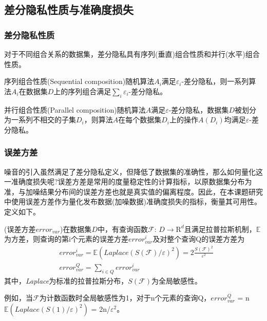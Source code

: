 \subsection{差分隐私性质与准确度损失}

\subsubsection{差分隐私性质}
对于不同组合关系的数据集，差分隐私具有序列(垂直)组合性质和并行(水平)组合性质。

\begin{lem}
	序列组合性质(Sequential composition)\supercite{composition}随机算法$A_{i}$满足$\varepsilon_{i}$-差分隐私，则一系列算法$A_{i}$在数据集$D$上的序列组合满足$\sum\limits_i \varepsilon_{i}$-差分隐私。
\end{lem}

\begin{lem}
	\label{parallel}
	并行组合性质(Parallel composition)\supercite{composition}随机算法$A$满足$\varepsilon$-差分隐私，数据集$D$被划分为一系列不相交的子集$D_{i}$，则算法$A$在每个数据集$D_{i}$上的操作$A(D_{i})$均满足$\varepsilon$-差分隐私。
\end{lem}

\subsubsection{误差方差}
噪音的引入虽然满足了差分隐私定义，但降低了数据集的准确性，那么如何量化这一准确度损失呢?误差方差是常用的度量稳定性的计算指标，以原数据集分布为准，与加噪结果分布间的误差方差也就是真实值的偏离程度。因此，在本课题研究中使用误差方差作为量化发布数据(加噪数据)准确度损失的指标，衡量其可用性。
定义如下。
\begin{defn}
	\label{thm:error}
	(\textsc{误差方差}$error_{var}$)\supercite{Dwork-Calibrating}在数据集$D$中，有查询函数$\mathcal{F}$: $D\rightarrow \mathrm{R}^d$且满足拉普拉斯机制，$\mathbb{E}$为方差，则查询的第i个元素的误差方差$error_{var}^{i}$及对整个查询Q的误差方差为
	\begin{eqnarray}
	&error_{var}^{i} = \mathbb{E}(\textit{Laplace}(S(\mathcal{F})/ \varepsilon)^2) = 2\frac{S(\mathcal{F})^2}{\varepsilon^2}\\
	&error_{var}^{Q} = \sum\nolimits_{i \in Q}error_{var}^{i}
	\end{eqnarray}
	其中，\textit{Laplace}为标准的拉普拉斯分布，$S(\mathcal{F})$为全局敏感性。
\end{defn}

例如，当$\mathcal{F}$为计数函数时全局敏感性为1，对于n个元素的查询Q，$error_{var}^{Q}$ = n$\mathbb{E}(\textit{Laplace}(S(1)/ \varepsilon)^2)$ = 2n/$\varepsilon^2$。

